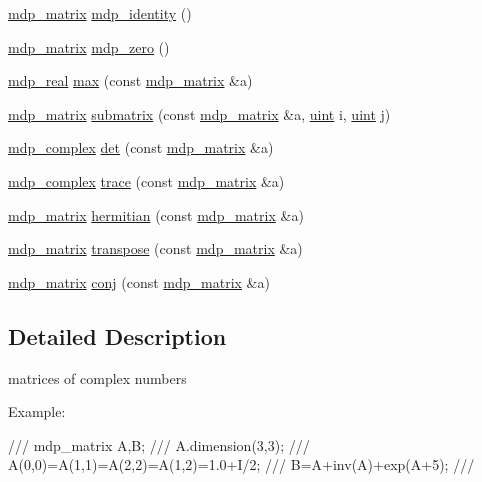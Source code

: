 \begin{DoxyCompactItemize}
\item 
\hyperlink{classmdp__matrix}{mdp\+\_\+matrix} \hyperlink{classmdp__matrix_a6b60fadcf53631a262b63ffb5f0f56ea}{mdp\+\_\+identity} ()
\item 
\hyperlink{classmdp__matrix}{mdp\+\_\+matrix} \hyperlink{classmdp__matrix_a1ba8b1ac1136a436607d0f7815868508}{mdp\+\_\+zero} ()
\item 
\hyperlink{mdp__global__vars_8h_a69d96b74c791e0bbdb888b3913a69450}{mdp\+\_\+real} \hyperlink{classmdp__matrix_a91537cc4584a782ada453ae45843ec0f}{max} (const \hyperlink{classmdp__matrix}{mdp\+\_\+matrix} \&a)
\item 
\hyperlink{classmdp__matrix}{mdp\+\_\+matrix} \hyperlink{classmdp__matrix_a28a3f69388892b5b30aad614ed75e375}{submatrix} (const \hyperlink{classmdp__matrix}{mdp\+\_\+matrix} \&a, \hyperlink{mdp__global__vars_8h_a91ad9478d81a7aaf2593e8d9c3d06a14}{uint} i, \hyperlink{mdp__global__vars_8h_a91ad9478d81a7aaf2593e8d9c3d06a14}{uint} j)
\item 
\hyperlink{classmdp__complex}{mdp\+\_\+complex} \hyperlink{classmdp__matrix_aed4c7d1f4639e8a8e7e435a617d59080}{det} (const \hyperlink{classmdp__matrix}{mdp\+\_\+matrix} \&a)
\item 
\hyperlink{classmdp__complex}{mdp\+\_\+complex} \hyperlink{classmdp__matrix_a5336fdab3a6eaa9888c91833f251f4e0}{trace} (const \hyperlink{classmdp__matrix}{mdp\+\_\+matrix} \&a)
\item 
\hyperlink{classmdp__matrix}{mdp\+\_\+matrix} \hyperlink{classmdp__matrix_a351ca320380dbd121764fa96d4f0f711}{hermitian} (const \hyperlink{classmdp__matrix}{mdp\+\_\+matrix} \&a)
\item 
\hyperlink{classmdp__matrix}{mdp\+\_\+matrix} \hyperlink{classmdp__matrix_a271d6793f4231f7b290179bff594e8d1}{transpose} (const \hyperlink{classmdp__matrix}{mdp\+\_\+matrix} \&a)
\item 
\hyperlink{classmdp__matrix}{mdp\+\_\+matrix} \hyperlink{classmdp__matrix_ae0dd178eaad795af699d595ca0ef5c37}{conj} (const \hyperlink{classmdp__matrix}{mdp\+\_\+matrix} \&a)
\end{DoxyCompactItemize}


\subsection{Detailed Description}
matrices of complex numbers 

Example\+: \begin{DoxyVerb}///    mdp_matrix A,B;
///    A.dimension(3,3);
///    A(0,0)=A(1,1)=A(2,2)=A(1,2)=1.0+I/2;
///    B=A+inv(A)+exp(A+5);
/// \end{DoxyVerb}
 

